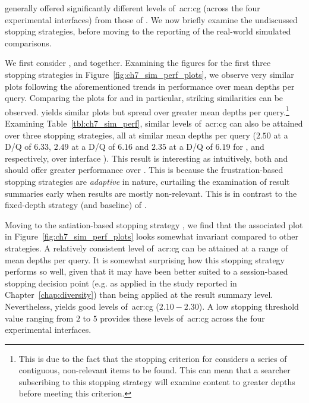 \noindent
generally offered significantly different levels of~\gls{acr:cg} (across the four experimental interfaces) from those of . We now briefly examine the undiscussed stopping strategies, before moving to the reporting of the real-world simulated comparisons.

We first consider ,  and  together. Examining the figures for the first three stopping strategies in Figure~\ref{fig:ch7_sim_perf_plots}, we observe very similar plots following the aforementioned trends in performance over mean depths per query. Comparing the plots for  and  in particular, striking similarities can be observed.  yields similar plots but spread over greater mean depths per query.\footnote{This is due to the fact that the stopping criterion for  considers a series of contiguous, non-relevant items to be found. This can mean that a searcher subscribing to this stopping strategy will examine content to greater depths before meeting this criterion.} Examining Table~\ref{tbl:ch7_sim_perf}, similar levels of~\gls{acr:cg} can also be attained over three stopping strategies, all at similar mean depths per query ($2.50$ at a D/Q of $6.33$, $2.49$ at a D/Q of $6.16$ and $2.35$ at a D/Q of $6.19$ for ,  and  respectively, over interface ). This result is interesting as intuitively, both  and  should offer greater performance over . This is because the frustration-based stopping strategies are \emph{adaptive} in nature, curtailing the examination of result summaries early when results are mostly non-relevant. This is in contrast to the fixed-depth strategy (and baseline) of .

Moving to the satiation-based stopping strategy , we find that the associated plot in Figure~\ref{fig:ch7_sim_perf_plots} looks somewhat invariant compared to other strategies. A relatively consistent level of~\gls{acr:cg} can be attained at a range of mean depths per query. It is somewhat surprising how this stopping strategy performs so well, given that it may have been better suited to a session-based stopping decision point (e.g. as applied in the study reported in Chapter~\ref{chap:diversity}) than being applied at the result summary level. Nevertheless,  yields good levels of~\gls{acr:cg} ($2.10-2.30$). A low stopping threshold value ranging from $2$ to $5$ provides these levels of~\gls{acr:cg} across the four experimental interfaces.

